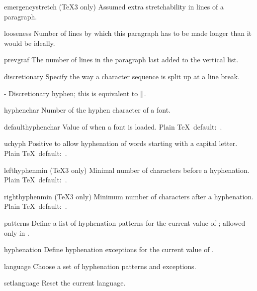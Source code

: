 \item emergencystretch
      (\TeX3 only)
      Assumed extra stretchability in lines of a paragraph.

\item looseness  
      Number of lines by which this paragraph has to be made longer 
      than it would be ideally.

\item prevgraf  
      The number of lines in the paragraph last
      added to the vertical list.

\item discretionary 
      Specify the way a character sequence is split up at a line break.

\item - 
      Discretionary hyphen; this is
      equivalent to \ver|\discretionary{-}{}{}|.

\item hyphenchar 
      Number of the hyphen character of a font.

\item defaulthyphenchar 
      Value of  when a font is loaded.
      Plain \TeX\ default:~.

\item uchyph 
      Positive to allow hyphenation of words starting with a capital 
      letter.
      Plain \TeX\ default:~.

\item lefthyphenmin 
      (\TeX3 only)
      Minimal number of characters before a hyphenation.
      Plain \TeX\ default:~.

\item righthyphenmin 
      (\TeX3 only)
      Minimum number of characters after a hyphenation.
      Plain \TeX\ default:~.

\item patterns 
      Define a list of hyphenation patterns for the current
      value of ;  allowed only in \IniTeX.

\item hyphenation 
      Define hyphenation exceptions for the current value of .

\item language 
      Choose a set of hyphenation patterns and exceptions.

\item setlanguage 
      Reset the current language.

\inventstop


